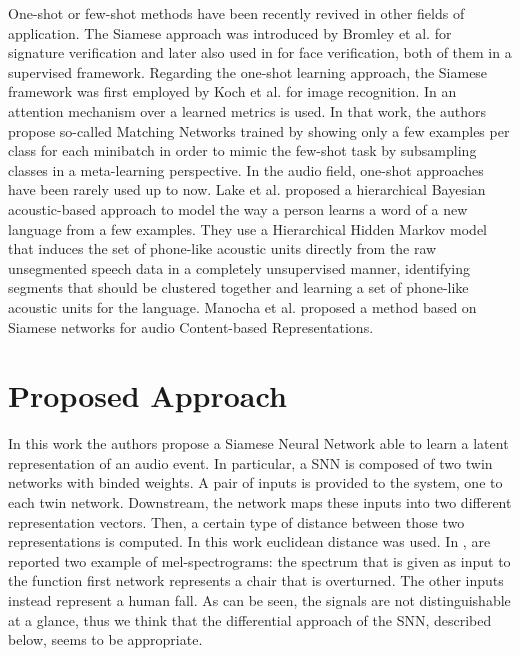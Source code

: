 One-shot or few-shot methods have been recently revived in other fields of application.
The Siamese approach was introduced by Bromley et al. \cite{bromley1994signature} for signature verification and later also used in \cite{chopra2005learning} for face verification, both of them in a supervised framework. Regarding the one-shot learning approach, the Siamese framework was first employed by Koch et al.\cite{koch2015siamese} for image recognition.
In \cite{vinyals2016matching} an attention mechanism over a learned metrics is used. In that work, the authors propose so-called Matching Networks trained by showing only a few examples per class for each minibatch in order to mimic the few-shot task by subsampling classes in a meta-learning perspective.
In the audio field, one-shot approaches have been rarely used up to now.
Lake et al. \cite{lake2014one} proposed a hierarchical Bayesian acoustic-based approach to model the way a person learns a word of a new language from a few examples. They use a Hierarchical Hidden Markov model that induces the set of phone-like acoustic units directly from the raw unsegmented speech data in a completely unsupervised manner, identifying segments that should be clustered together and learning a set of phone-like acoustic units for the language.
Manocha et al.\cite{manocha2017content} proposed a method based on Siamese networks for audio Content-based Representations.

\section{Proposed Approach}
\label{sec:proposed_app}
In this work the authors propose a Siamese Neural Network able to learn a latent representation of an audio event. In particular, a SNN is composed of two twin networks with binded weights. A pair of inputs is provided to the system, one to each twin network. Downstream, the network maps these inputs into two different representation vectors. Then, a certain type of distance between those two representations is computed. In this work euclidean distance was used. In , are reported two example of mel-spectrograms: the spectrum that is given as input to the function first network represents a chair that is overturned. The other inputs instead represent a human fall. As can be seen, the signals are not distinguishable at a glance, thus we think that the differential approach of the SNN, described below, seems to be appropriate.

